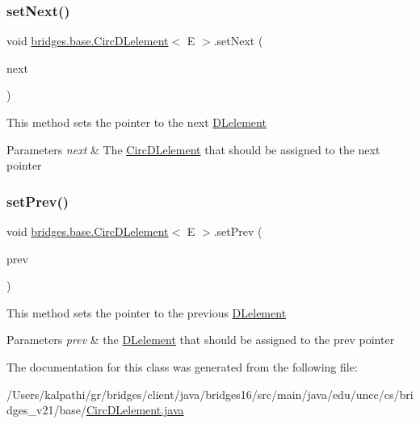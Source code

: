 \subsubsection{\texorpdfstring{set\+Next()}{setNext()}}
{\footnotesize\ttfamily void \hyperlink{classbridges_1_1base_1_1_circ_d_lelement}{bridges.\+base.\+Circ\+D\+Lelement}$<$ E $>$.set\+Next (\begin{DoxyParamCaption}\item[{\hyperlink{classbridges_1_1base_1_1_circ_d_lelement}{Circ\+D\+Lelement}$<$ E $>$}]{next }\end{DoxyParamCaption})}

This method sets the pointer to the next \hyperlink{classbridges_1_1base_1_1_d_lelement}{D\+Lelement}


\begin{DoxyParams}{Parameters}
{\em next} & The \hyperlink{classbridges_1_1base_1_1_circ_d_lelement}{Circ\+D\+Lelement} that should be assigned to the next pointer \\
\hline
\end{DoxyParams}
\hypertarget{classbridges_1_1base_1_1_circ_d_lelement_ade2cf166a572c051cd284f4e5ba67780}{}\label{classbridges_1_1base_1_1_circ_d_lelement_ade2cf166a572c051cd284f4e5ba67780} 
\subsubsection{\texorpdfstring{set\+Prev()}{setPrev()}}
{\footnotesize\ttfamily void \hyperlink{classbridges_1_1base_1_1_circ_d_lelement}{bridges.\+base.\+Circ\+D\+Lelement}$<$ E $>$.set\+Prev (\begin{DoxyParamCaption}\item[{\hyperlink{classbridges_1_1base_1_1_circ_d_lelement}{Circ\+D\+Lelement}$<$ E $>$}]{prev }\end{DoxyParamCaption})}

This method sets the pointer to the previous \hyperlink{classbridges_1_1base_1_1_d_lelement}{D\+Lelement}


\begin{DoxyParams}{Parameters}
{\em prev} & the \hyperlink{classbridges_1_1base_1_1_d_lelement}{D\+Lelement} that should be assigned to the prev pointer \\
\hline
\end{DoxyParams}


The documentation for this class was generated from the following file\+:\begin{DoxyCompactItemize}
\item 
/\+Users/kalpathi/gr/bridges/client/java/bridges16/src/main/java/edu/uncc/cs/bridges\+\_\+v21/base/\hyperlink{_circ_d_lelement_8java}{Circ\+D\+Lelement.\+java}\end{DoxyCompactItemize}
